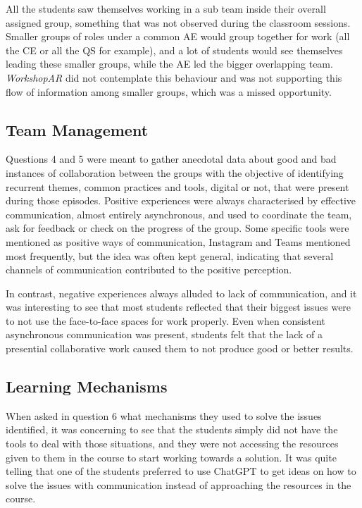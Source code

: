 All the students saw themselves working in a sub team inside their overall assigned group, something that was not observed during the classroom sessions. Smaller groups
of roles under a common \ac{AE} would group together for work (all the \ac{CE} or all the \ac{QS} for example), and a lot of students would see themselves leading these
smaller groups, while the \ac{AE} led the bigger overlapping team. \emph{WorkshopAR} did not contemplate this behaviour and was not supporting this flow of information
among smaller groups, which was a missed opportunity.

\subsection{Team Management \label{sec:6-9-2}}

Questions 4 and 5 were meant to gather anecdotal data about good and bad instances of collaboration between the groups with the objective of identifying recurrent themes,
common practices and tools, digital or not, that were present during those episodes. Positive experiences were always characterised by effective communication, almost
entirely asynchronous, and used to coordinate the team, ask for feedback or check on the progress of the group. Some specific tools were mentioned as positive ways of
communication, Instagram and Teams mentioned most frequently, but the idea was often kept general, indicating that several channels of communication contributed to the
positive perception.

In contrast, negative experiences always alluded to lack of communication, and it was interesting to see that most students reflected that their biggest issues were to not
use the face-to-face spaces for work properly. Even when consistent asynchronous communication was present, students felt that the lack of a presential collaborative work
caused them to not produce good or better results.

\subsection{Learning Mechanisms \label{sec:6-9-3}}

When asked in question 6 what mechanisms they used to solve the issues identified, it was concerning to see that the students simply did not have the tools to deal with
those situations, and they were not accessing the resources given to them in the course to start working towards a solution. It was quite telling that one of the students
preferred to use ChatGPT to get ideas on how to solve the issues with communication instead of approaching the resources in the course.

